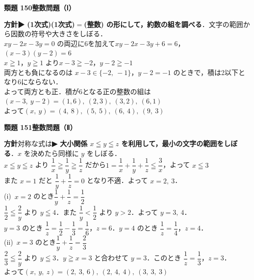 \documentclass[a4paper,11pt]{ltjsarticle}
\newcommand{\ans}[2]{\Needspace{5\baselineskip}\vspace{6pt}%
  {\sffamily\bfseries 類題 #1\quad #2}\par}
\newcommand{\point}[1]{\textsf{\bfseries ▶ #1}}
\begin{document}
\ans{150}{整数問題（Ⅰ）}
\begin{kai}
\textbf{方針}\quad \point{(1次式)(1次式)$=$(整数) の形にして，約数の組を調べる}．文字の範囲から因数の符号や大きさをしぼる．\\[2pt]
$xy-2x-3y=0$ の両辺に6を加えて\quad $xy-2x-3y+6=6$，\quad $(x-3)(y-2)=6$\\[2pt]
$x\geqq1$，$y\geqq1$ より\quad $x-3\geqq-2$，\quad $y-2\geqq-1$\\
両方とも負になるのは $x-3\in\{-2,\ -1\}$，$y-2=-1$ のときで，積は2以下となり6にならない．\\
よって両方とも正．積が6となる正の整数の組は\\
\hspace*{1.5em}$(x-3,\ y-2)=(1,6),\ (2,3),\ (3,2),\ (6,1)$\\
よって\quad $(x,\ y)=(4,\ 8),\ (5,\ 5),\ (6,\ 4),\ (9,\ 3)$
\end{kai}

\ans{151}{整数問題（Ⅱ）}
\begin{kai}
\textbf{方針}\quad 対称な式は\point{大小関係 $x\leqq y\leqq z$ を利用して，最小の文字の範囲をしぼる}．$x$ を決めたら同様に $y$ をしぼる．\\[2pt]
$x\leqq y\leqq z$ より $\dfrac1x\geqq\dfrac1y\geqq\dfrac1z$ だから\quad $1=\dfrac1x+\dfrac1y+\dfrac1z\leqq\dfrac3x$，\quad よって $x\leqq3$\\
また $x=1$ だと $\dfrac1y+\dfrac1z=0$ となり不適．よって $x=2,\ 3$．\\[2pt]
(i)\ $x=2$ のとき\quad $\dfrac1y+\dfrac1z=\dfrac12$\\
\hspace*{1.5em}$\dfrac12\leqq\dfrac2y$ より $y\leqq4$．また $\dfrac1y<\dfrac12$ より $y>2$．よって $y=3,\ 4$．\\
\hspace*{1.5em}$y=3$ のとき $\dfrac1z=\dfrac12-\dfrac13=\dfrac16$，$z=6$．\quad $y=4$ のとき $\dfrac1z=\dfrac14$，$z=4$．\\[2pt]
(ii)\ $x=3$ のとき\quad $\dfrac1y+\dfrac1z=\dfrac23$\\
\hspace*{1.5em}$\dfrac23\leqq\dfrac2y$ より $y\leqq3$．$y\geqq x=3$ と合わせて $y=3$．このとき $\dfrac1z=\dfrac13$，$z=3$．\\[2pt]
よって\quad $(x,\ y,\ z)=(2,\ 3,\ 6),\ (2,\ 4,\ 4),\ (3,\ 3,\ 3)$
\end{kai}
\end{document}
